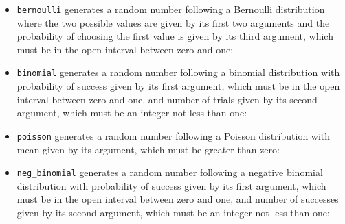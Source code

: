 \begin{itemize}
\item {\tt bernoulli} generates a random number following a Bernoulli distribution where the two possible
values are given by its first two arguments and the probability of choosing the first value is given by its
third argument, which must be in the open interval between zero and one:

\item {\tt binomial} generates a random number following a binomial distribution with probability of success
given by its first argument, which must be in the open interval between zero and one, and number of trials
given by its second argument, which must be an integer not less than one:

\item {\tt poisson} generates a random number following a Poisson distribution with mean given by its
argument, which must be greater than zero:

\item {\tt neg\_binomial} generates a random number following a negative binomial distribution with
probability of success given by its first argument, which must be in the open interval between zero and one,
and number of successes given by its second argument, which must be an integer not less than one:


\end{itemize}
